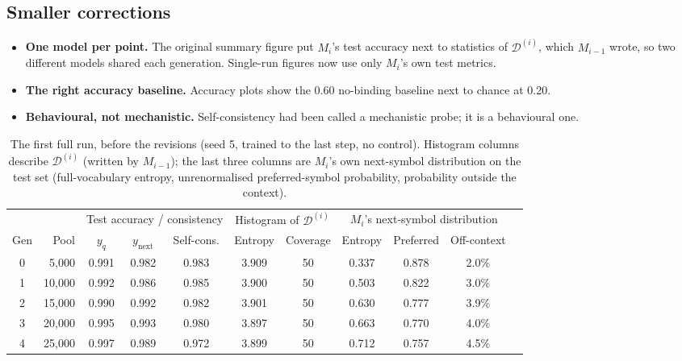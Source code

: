 \documentclass[11pt,a4paper]{article}
\newcommand{\ynext}{y_{\mathrm{next}}}
\newcommand{\yq}{y_{q}}
\newcommand{\data}[1]{\mathcal{D}^{(#1)}}
\begin{document}
\subsection{Smaller corrections}
\begin{itemize}[leftmargin=1.4em]
  \item \textbf{One model per point.} The original summary figure put $M_i$'s
        test accuracy next to statistics of $\data{i}$, which $M_{i-1}$ wrote,
        so two different models shared each generation. Single-run figures
        now use only $M_i$'s own test metrics.
  \item \textbf{The right accuracy baseline.} Accuracy plots show the 0.60
        no-binding baseline next to chance at 0.20.
  \item \textbf{Behavioural, not mechanistic.} Self-consistency had been
        called a mechanistic probe; it is a behavioural one.
\end{itemize}

\begin{table}[htbp]
\centering
\footnotesize
\setlength{\tabcolsep}{4pt}
\caption{The first full run, before the revisions (seed 5, trained to the last
step, no control). Histogram columns describe $\data{i}$ (written by
$M_{i-1}$); the last three columns are $M_i$'s own next-symbol distribution on
the test set (full-vocabulary entropy, unrenormalised preferred-symbol
probability, probability outside the context).}
\label{tab:firstrun}
\begin{tabular}{crccccccccc}
\toprule
 & & \multicolumn{3}{c}{Test accuracy / consistency} & \multicolumn{2}{c}{Histogram of $\data{i}$} & \multicolumn{3}{c}{$M_i$'s next-symbol distribution}\\
\cmidrule(lr){3-5}\cmidrule(lr){6-7}\cmidrule(lr){8-10}
Gen & Pool & $\yq$ & $\ynext$ & Self-cons. & Entropy & Coverage & Entropy & Preferred & Off-context\\
\midrule
0 & 5{,}000 & 0.991 & 0.982 & 0.983 & 3.909 & 50 & 0.337 & 0.878 & 2.0\% \\
1 & 10{,}000 & 0.992 & 0.986 & 0.985 & 3.900 & 50 & 0.503 & 0.822 & 3.0\% \\
2 & 15{,}000 & 0.990 & 0.992 & 0.982 & 3.901 & 50 & 0.630 & 0.777 & 3.9\% \\
3 & 20{,}000 & 0.995 & 0.993 & 0.980 & 3.897 & 50 & 0.663 & 0.770 & 4.0\% \\
4 & 25{,}000 & 0.997 & 0.989 & 0.972 & 3.899 & 50 & 0.712 & 0.757 & 4.5\% \\
\bottomrule
\end{tabular}
\end{table}
\end{document}
